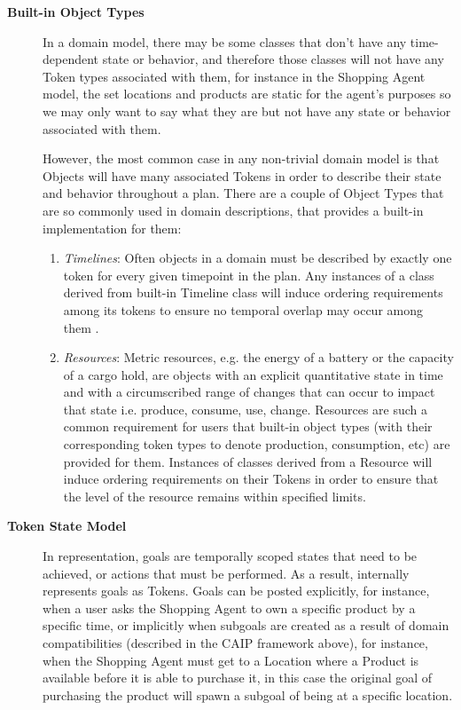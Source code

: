 \begin{description}
\begin{enumerate}
  \end{enumerate}

\item[\textbf{Built-in Object Types}] In a domain model, there may be
  some classes that don't have any time-dependent state or behavior,
  and therefore those classes will not have any Token types associated
  with them, for instance in the Shopping Agent model, the set
  locations and products are static for the agent's purposes so we may
  only want to say what they are but not have any state or behavior
  associated with them.

  However, the most common case in any non-trivial domain model is
  that Objects will have many associated Tokens in order to describe
  their state and behavior throughout a plan. There are a couple of
  Object Types that are so commonly used in domain descriptions, that
  \eu provides a built-in implementation for them:

\begin{enumerate}

\item \textit{Timelines}: Often objects in a domain must be described
  by exactly one token for every given timepoint in the plan. Any
  instances of a class derived from \eus built-in Timeline class will
  induce ordering requirements among its tokens to ensure no temporal
  overlap may occur among them \cite{mus94}.  

\item \textit{Resources}: Metric resources, e.g. the energy of a
  battery or the capacity of a cargo hold, are objects with an
  explicit quantitative state in time and with a circumscribed range
  of changes that can occur to impact that state i.e. produce,
  consume, use, change.  Resources are such a common requirement for
  \eu users that built-in object types (with their corresponding token
  types to denote production, consumption, etc) are provided for
  them. Instances of classes derived from a Resource will induce
  ordering requirements on their Tokens in order to ensure that the
  level of the resource remains within specified limits.
\end{enumerate}

\item[\textbf{Token State Model}] In \eus representation, goals are
  temporally scoped states that need to be achieved, or actions that
  must be performed. As a result, \eu internally represents goals as
  Tokens.  Goals can be posted explicitly, for instance, when a user
  asks the Shopping Agent to own a specific product by a specific
  time, or implicitly when subgoals are created as a result of domain
  compatibilities (described in the CAIP framework above), for
  instance, when the Shopping Agent must get to a Location where a
  Product is available before it is able to purchase it, in this case
  the original goal of purchasing the product will spawn a subgoal of
  being at a specific location.


\end{description}
